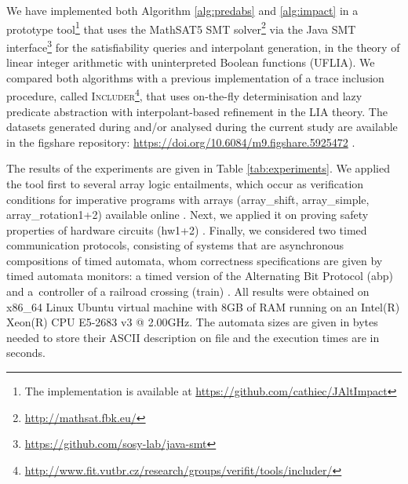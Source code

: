 \documentclass[10pt]{llncs}
\begin{document}
We have implemented both Algorithm \ref{alg:predabs} and
\ref{alg:impact} in a prototype tool\footnote{The implementation is
  available at \url{https://github.com/cathiec/JAltImpact}} that uses
the MathSAT5 SMT solver\footnote{\url{http://mathsat.fbk.eu/}} via the
Java SMT
interface\footnote{\url{https://github.com/sosy-lab/java-smt}} for the
satisfiability queries and interpolant generation, in the theory of
linear integer arithmetic with uninterpreted Boolean functions
(UFLIA). We compared both algorithms with a previous implementation of
a trace inclusion procedure, called
\textsc{Includer}\footnote{\url{http://www.fit.vutbr.cz/research/groups/verifit/tools/includer/}},
that uses on-the-fly determinisation and lazy predicate abstraction
with interpolant-based refinement \cite{Tacas16} in the LIA theory.
The datasets generated during and/or analysed during the current study
are available in the figshare repository:
\url{https://doi.org/10.6084/m9.figshare.5925472} \cite{figshare}.

The results of the experiments are given in Table
\ref{tab:experiments}. We applied the tool first to several array
logic entailments, which occur as verification conditions for
imperative programs with arrays \cite{cav09} (array\_shift,
array\_simple, array\_rotation1+2) available online
\cite{ntslib}. Next, we applied it on proving safety properties of
hardware circuits (hw1+2) \cite{smrcka}. Finally, we considered two
timed communication protocols, consisting of systems that are
asynchronous compositions of timed automata, whom correctness
specifications are given by timed automata monitors: a timed version
of the Alternating Bit Protocol (abp) \cite{abp} and a~controller of a
railroad crossing (train) \cite{henzinger:RealTimeSystems}. All
results were obtained on x86\_64 Linux Ubuntu virtual machine with 8GB
of RAM running on an Intel(R) Xeon(R) CPU E5-2683 v3 @ 2.00GHz. The
automata sizes are given in bytes needed to store their ASCII
description on file and the execution times are in seconds.
\end{document}
